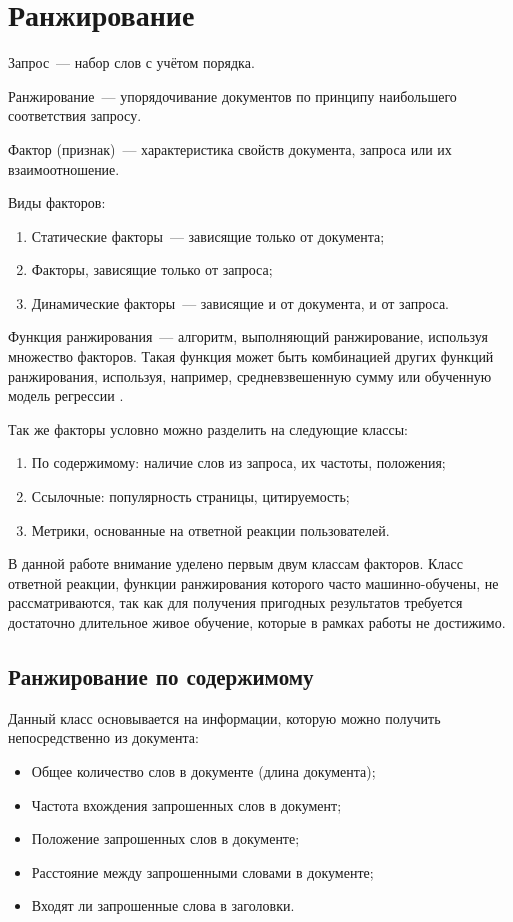 \section{Ранжирование}
Запрос~--- набор слов с учётом порядка.

Ранжирование~--- упорядочивание документов по принципу наибольшего соответствия запросу.

Фактор (признак)~--- характеристика свойств документа, запроса или их взаимоотношение.

Виды факторов:
\begin{enumerate}
  \item Статические факторы~--- зависящие только от документа;
  \item Факторы, зависящие только от запроса;
  \item Динамические факторы~--- зависящие и от документа, и от запроса.
\end{enumerate}

Функция ранжирования~--- алгоритм, выполняющий ранжирование, используя множество факторов. Такая функция может быть комбинацией других функций ранжирования, используя, например, средневзвешенную сумму или обученную модель регрессии \cite{segaran07}.

Так же факторы условно можно разделить на следующие классы:
\begin{enumerate}
  \item По содержимому: наличие слов из запроса, их частоты, положения;
  \item Ссылочные: популярность страницы, цитируемость;
  \item Метрики, основанные на ответной реакции пользователей.
\end{enumerate}

В данной работе внимание уделено первым двум классам факторов. Класс ответной реакции, функции ранжирования которого часто машинно-обучены, не рассматриваются, так как для получения пригодных результатов требуется достаточно длительное живое обучение, которые в рамках работы не достижимо.


\subsection{Ранжирование по содержимому}
Данный класс основывается на информации, которую можно получить непосредственно из документа:
\begin{itemize}
  \item Общее количество слов в документе (длина документа);
  \item Частота вхождения запрошенных слов в документ;
  \item Положение запрошенных слов в документе;
  \item Расстояние между запрошенными словами в документе;
  \item Входят ли запрошенные слова в заголовки.
\end{itemize}


